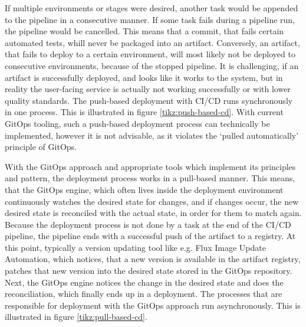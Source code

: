 If multiple environments or stages were desired,
another task would be appended to the pipeline
in a consecutive manner.
If some task fails during a pipeline run,
the pipeline would be cancelled.
This means that a commit, that fails certain automated tests,
whill never be packaged into an artifact.
Conversely, an artifact, that fails to deploy to a certain environment,
will most likely not be deployed to consecutive environments, because of the stopped pipeline.
It is challenging, if an artifact is successfully deployed,
and looks like it works to the system,
but in reality the user-facing service is actually not working successfully or with lower quality standards.
The push-based deployment with CI/CD runs synchronously in one process.
This is illustrated in figure \ref{tikz:push-based-cd}.
With current GitOps tooling,
such a push-based deployment process can technically be implemented,
however it is not advisable, as it violates the \enquote*{pulled automatically} principle of GitOps.




With the GitOps approach and appropriate tools which implement its principles and pattern,
the deployment process works in a pull-based manner.
This means, that the GitOps engine, which often lives inside the deployment environment
continuously watches the desired state for changes,
and if changes occur, the new desired state is reconciled with the actual state, in order for them to match again.
Because the deployment process is not done by a task at the end of the CI/CD pipeline,
the pipeline ends with a successful push of the artifact to a registry.
At this point, typically a version updating tool like e.g. Flux Image Update Automation, which notices, that a new version is available in
the artifact registry, patches that new version into the desired state stored in the GitOps repository.
Next, the GitOps engine notices the change in the desired state and does the reconciliation,
which finally ends up in a deployment.
The processes that are responsible for deployment with the GitOps approach run asynchronously.
This is illustrated in figure \ref{tikz:pull-based-cd}.





